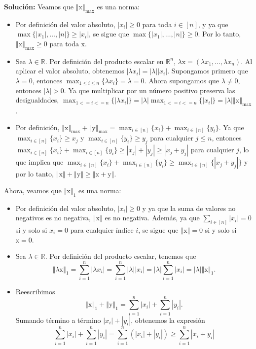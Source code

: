 \documentclass[12pt]{article}
\newcommand{\abs}[1]{\left\vert#1\right\vert}
\newcommand{\norm}[1]{\left\Vert#1\right\Vert}
\newcommand{\R}{\mathbb R}
\newcommand{\x}{\mathrm x}
\newcommand{\y}{\mathrm y}
\begin{document}
\begin{enumerate}
\begin{enumerate}[(1)]
\textbf{Solución: } Veamos que \(\norm{\x}_{\max}\) es una norma:
    \begin{itemize}
        \item Por definición del valor absoluto, \(\abs{x_i} \geq 0\) para toda \(i \in [n]\), y ya que \(\max\{\abs{x_1}, \dots, \abs{n}\} \geq \abs{x_i}\), se sigue que \(\max\{\abs{x_1}, \dots, \abs{n}\} \geq 0\). Por lo tanto, \(\norm{\x}_{\max} \geq 0\) para toda \(\x\).
        \item Sea \(\lambda \in \R\). Por definición del producto escalar en \(\R^n\), \(\lambda \x = (\lambda x_1, \dots, \lambda x_n)\). Al aplicar el valor absoluto, obtenemos \(\abs{\lambda x_i} = \abs{\lambda} \abs{x_i}\). Supongamos primero que \(\lambda = 0\), entonces \(\max_{1 \leq i \leq n} \{\lambda x_i\} = \lambda = 0\). Ahora supongamos que \(\lambda \neq 0\), entonces \(\abs{\lambda} > 0\). Ya que multiplicar por un número positivo preserva las desigualdades, \(\max_{1 <= i <= n}\{\abs{\lambda x_i}\} = \abs{\lambda} \max_{1 <= i <= n}\{\abs{x_i}\} = \abs{\lambda} \norm{\x}_{\max}\).
        \item Por definición, \(\norm{\x}_{\max} + \norm{\y}_{\max} = \max_{i\in[n]}\{x_i\} + \max_{i\in[n]}\{y_i\}\). Ya que \(\max_{i\in[n]}\{x_i\} \geq x_j\) y \(\max_{i\in[n]}\{y_i\} \geq y_j\) para cualquier \(j \leq n\), entonces \(\max_{i\in[n]}\{x_i\} + \max_{i\in[n]}\{y_i\} \geq \abs{x_j} + \abs{y_j} \geq \abs{x_j + y_j}\) para cualquier \(j\), lo que implica que \(\max_{i\in[n]}\{x_i\} + \max_{i\in[n]}\{y_i\} \geq \max_{i \in [n]}\{\abs{x_j + y_j}\}\) y por lo tanto, \(\norm{\x} + \norm{\y} \geq \norm{\x + \y}\).
    \end{itemize}
Ahora, veamos que \(\norm{\x}_1\) es una norma:
\begin{itemize}
    \item Por definición del valor absoluto, \(\abs{x_i} \geq 0\) y ya que la suma de valores no negativos es no negativa, \(\norm{\x}\) es no negativa. Además, ya que \(\sum_{i \in [n]}|x_i| = 0\) si y solo si \(x_i = 0\) para cualquier índice \(i\), se sigue que \(\norm{\x} = 0\) si y solo si \(\x = 0\).
    \item Sea \(\lambda \in \mathbb{R}\). Por definición del producto escalar, tenemos que 
    \[\norm{\lambda \x}_1 = \sum_{i = 1}^{n}\abs{\lambda x_i} = \sum_{i = 1}^{n}\abs{\lambda}\abs{x_i} = \abs{\lambda}\sum_{i = 1}^{n}\abs{x_i} = \abs{\lambda}\norm{\x}_1.\]
    \item Reescribimos
    \[
    \norm{\x}_1 + \norm{\y}_1 = \sum_{i = 1}^{n}\abs{x_i} + \sum_{i = 1}^{n}\abs{y_i}.
    \]
    Sumando término a término \(\abs{x_i} + \abs{y_i}\), obtenemos la expresión
    \[
    \sum_{i = 1}^{n}\abs{x_i} + \sum_{i = 1}^{n}\abs{y_i} = \sum_{i = 1}^{n}(\abs{x_i} + \abs{y_i}) \geq \sum_{i = 1}^{n}\abs{x_i + y_i}
    \]
    

\end{itemize}
\end{enumerate}
\end{enumerate}
\end{document}
